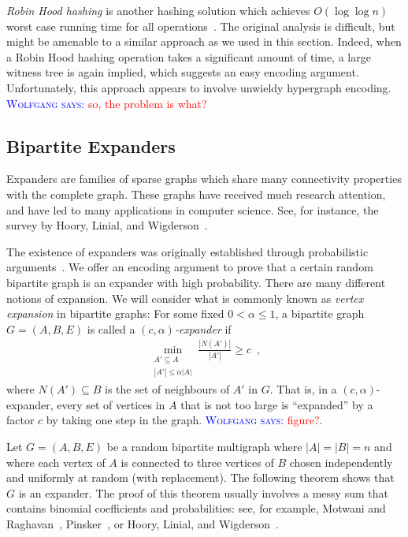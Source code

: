 \documentclass{patmorin}
\newcommand{\aremark}[3]{\textcolor{blue}{\textsc{#1 #2:}}
  \textcolor{red}{\textsf{#3}}}
\newcommand{\wolfgang}[2][says]{\aremark{Wolfgang}{#1}{#2}}
\begin{document}
\begin{rem}
  \emph{Robin Hood hashing} is another hashing solution which achieves
  $O(\log \log n)$ worst case running time for all
  operations~\cite{devroye:robin}. The original analysis is difficult,
  but might be amenable to a similar approach as we used in
  this section. Indeed, when a Robin Hood hashing operation takes a
  significant amount of time, a large witness tree is again implied,
  which suggests an easy encoding argument. Unfortunately, this
  approach appears to involve unwieldy hypergraph encoding.
  \wolfgang{so, the problem is what?}
\end{rem}


\subsection{Bipartite Expanders}

Expanders are families of sparse graphs which share many connectivity
properties with the complete graph. These
graphs have received much research attention, and have led to many
applications in computer science. See, for instance, the survey by
Hoory, Linial, and Wigderson~\cite{hoory.linial.ea:expander}.

The existence of expanders was originally
established through probabilistic arguments~\cite{pinsker:expanders}.
We offer an encoding argument to prove that a certain random bipartite
graph is an expander with high probability. There are many different
notions of expansion. We will consider what is commonly known as
\emph{vertex expansion} in bipartite graphs: For some fixed
$0 < \alpha \leq 1$, a bipartite graph $G = (A, B, E)$ is called a
\emph{$(c, \alpha)$-expander} if
\begin{align*}
  \min_{\substack{{A' \subseteq A}\\{|A'| \leq \alpha |A|}}} \frac{|N(A')|}{|A'|} \geq c \enspace ,
\end{align*}
where $N(A') \subseteq B$ is the set of neighbours of $A'$ in $G$.
That is, in a $(c, \alpha)$-expander, every set  of vertices in
$A$ that is not too large is ``expanded'' by a factor $c$ by taking
one step in the graph.
\wolfgang{figure?}.

Let $G = (A, B, E)$ be a random bipartite multigraph where
$|A| = |B| = n$ and where each vertex of $A$ is connected to three
vertices of $B$ chosen independently and uniformly at random (with
replacement). The following theorem shows that $G$ is an expander.
The proof of this theorem usually involves a messy sum that contains
binomial coefficients and probabilities: see, for example, Motwani and
Raghavan~\cite[Theorem~5.3]{motwani.raghavan:randomized},
Pinsker~\cite[Lemma~1]{pinsker:expanders}, or Hoory, Linial, and
Wigderson~\cite[Lemma~1.9]{hoory.linial.ea:expander}.
\end{document}
